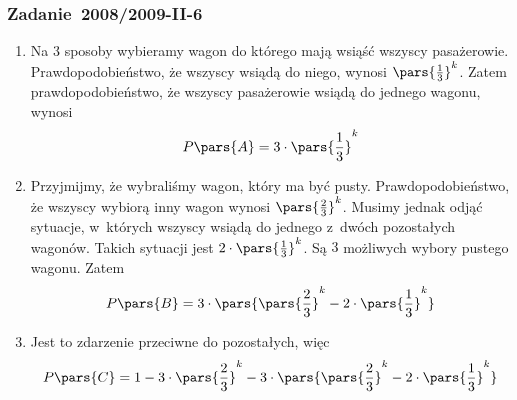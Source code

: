 \subsubsection*{Zadanie~2008/2009-II-6}
\begin{enumerate}[label={\Alph*:}]
    \item Na \(3\) sposoby wybieramy wagon do którego mają wsiąść wszyscy pasażerowie. Prawdopodobieństwo, że wszyscy wsiądą do niego, wynosi \(\pars{\frac{1}{3}}^k\). Zatem prawdopodobieństwo, że wszyscy pasażerowie wsiądą do jednego wagonu, wynosi
        \begin{equation*}
            P\pars{A} = 3 \cdot \pars{\frac{1}{3}}^k
        \end{equation*}
    \item Przyjmijmy, że wybraliśmy wagon, który ma być pusty. Prawdopodobieństwo, że wszyscy wybiorą inny wagon wynosi \(\pars{\frac{2}{3}}^k\). Musimy jednak odjąć sytuacje, w~których wszyscy wsiądą do jednego z~dwóch pozostałych wagonów. Takich sytuacji jest \(2 \cdot \pars{\frac{1}{3}}^k\). Są \(3\) możliwych wybory pustego wagonu. Zatem
        \begin{equation*}
            P\pars{B} = 3 \cdot \pars{\pars{\frac{2}{3}}^k - 2 \cdot \pars{\frac{1}{3}}^k}
        \end{equation*}
    \item Jest to zdarzenie przeciwne do pozostałych, więc
        \begin{equation*}
            P\pars{C}
            = 1 - 3 \cdot \pars{\frac{2}{3}}^k - 3 \cdot \pars{\pars{\frac{2}{3}}^k - 2 \cdot \pars{\frac{1}{3}}^k}
        \end{equation*}
\end{enumerate}
